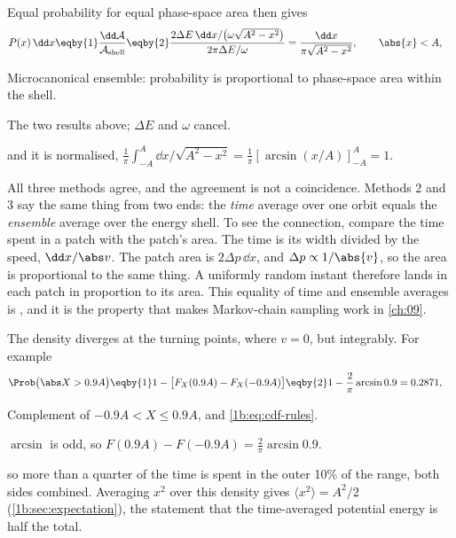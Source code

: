 Equal probability for equal phase-space area then gives
\begin{align*}
  P(x)\,\dd x
  &\eqby{1} \frac{\dd\mathcal A}{\mathcal A_{\rm shell}}
   \eqby{2} \frac{2\Delta E\,\dd x/\bigl(\omega\sqrt{A^2-x^2}\bigr)}{2\pi\Delta E/\omega}
   = \frac{\dd x}{\pi\sqrt{A^2-x^2}},
  \qquad \abs{x}<A,
\end{align*}
\begin{explain}
  \item Microcanonical ensemble: probability is proportional to phase-space area within the shell.
  \item The two results above; $\Delta E$ and $\omega$ cancel.
\end{explain}
and it is normalised, $\frac1\pi\int_{-A}^{A}\dd x/\sqrt{A^2-x^2}=\frac1\pi[\arcsin(x/A)]_{-A}^{A}=1$.

All three methods agree, and the agreement is not a coincidence. Methods 2 and 3
say the same thing from two ends: the \emph{time} average over one orbit equals
the \emph{ensemble} average over the energy shell. To see the connection, compare the time spent in a
patch with the patch's area. The time is its width divided by the speed, $\dd x/\abs v$. The patch area
is $2\Delta p\,\dd x$, and $\Delta p\propto1/\abs{v}$, so the area is
proportional to the same thing. A uniformly random instant therefore lands in
each patch in proportion to its area. This equality of time and
ensemble averages is , and it is the property that makes
Markov-chain sampling work in \cref{ch:09}.

The density diverges at the turning points, where $v=0$, but integrably. For example
\begin{align*}
  \Prob\bigl(\abs X>0.9A\bigr)
  &\eqby{1} 1-\bigl[F_X(0.9A)-F_X(-0.9A)\bigr]
   \eqby{2} 1-\frac2\pi\arcsin0.9
   = 0.2871 ,
\end{align*}
\begin{explain}
  \item Complement of $-0.9A<X\le0.9A$, and \eqref{1b:eq:cdf-rules}.
  \item $\arcsin$ is odd, so $F(0.9A)-F(-0.9A)=\tfrac2\pi\arcsin0.9$.
\end{explain}
so more than a quarter of the time is spent in the outer 10\% of the range, both sides
combined. Averaging $x^2$ over this density gives
$\langle x^2\rangle=A^2/2$ (\cref{1b:sec:expectation}), the statement that the
time-averaged potential energy is half the total.


